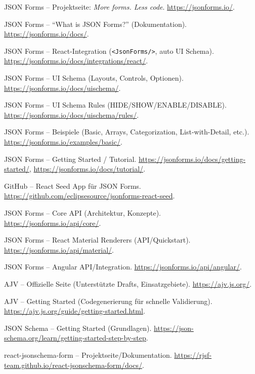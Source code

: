 \documentclass[11pt,a4paper]{article}
\begin{document}
\begin{thebibliography}{99}

JSON Forms -- Projektseite: \emph{More forms. Less code}. \url{https://jsonforms.io/}.

JSON Forms -- ``What is JSON Forms?'' (Dokumentation). \url{https://jsonforms.io/docs/}.

JSON Forms -- React-Integration (\texttt{<JsonForms/>}, auto UI Schema). \url{https://jsonforms.io/docs/integrations/react/}.

JSON Forms -- UI Schema (Layouts, Controls, Optionen). \url{https://jsonforms.io/docs/uischema/}.

JSON Forms -- UI Schema Rules (HIDE/SHOW/ENABLE/DISABLE). \url{https://jsonforms.io/docs/uischema/rules/}.

JSON Forms -- Beispiele (Basic, Arrays, Categorization, List-with-Detail, etc.). \url{https://jsonforms.io/examples/basic/}.

JSON Forms -- Getting Started / Tutorial. \url{https://jsonforms.io/docs/getting-started/}, \url{https://jsonforms.io/docs/tutorial/}.

GitHub -- React Seed App f\"ur JSON Forms. \url{https://github.com/eclipsesource/jsonforms-react-seed}.

JSON Forms -- Core API (Architektur, Konzepte). \url{https://jsonforms.io/api/core/}.

JSON Forms -- React Material Renderers (API/Quickstart). \url{https://jsonforms.io/api/material/}.

JSON Forms -- Angular API/Integration. \url{https://jsonforms.io/api/angular/}.

AJV -- Offizielle Seite (Unterst\"utzte Drafts, Einsatzgebiete). \url{https://ajv.js.org/}.

AJV -- Getting Started (Codegenerierung f\"ur schnelle Validierung). \url{https://ajv.js.org/guide/getting-started.html}.

JSON Schema -- Getting Started (Grundlagen). \url{https://json-schema.org/learn/getting-started-step-by-step}.

react-jsonschema-form -- Projektseite/Dokumentation. \url{https://rjsf-team.github.io/react-jsonschema-form/docs/}.

\end{thebibliography}
\end{document}
